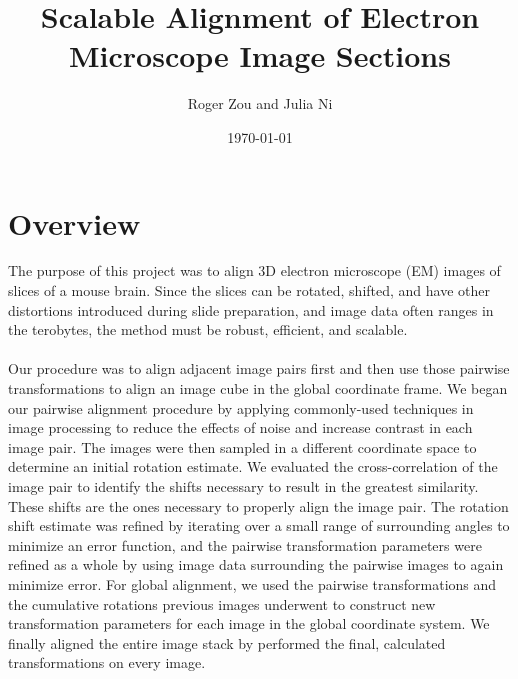 \documentclass{article}
\author{Roger Zou and Julia Ni}
\date{\today}
\title{Scalable Alignment of Electron Microscope Image Sections}
\begin{document}
  
\maketitle
 
\section{Overview}
The purpose of this project was to align 3D electron microscope (EM) images of slices of a mouse brain. Since the slices can be rotated, shifted, and have other distortions introduced during slide preparation, and image data often ranges in the terobytes, the method must be robust, efficient, and scalable.\\
\\
Our procedure was to align adjacent image pairs first and then use those pairwise transformations to align an image cube in the global coordinate frame. We began our pairwise alignment procedure by applying commonly-used techniques in image processing to reduce the effects of noise and increase contrast in each image pair. The images were then sampled in a different coordinate space to determine an initial rotation estimate. We evaluated the cross-correlation of the image pair to identify the shifts necessary to result in the greatest similarity. These shifts are the ones necessary to properly align the image pair. The rotation shift estimate was refined by iterating over a small range of surrounding angles to minimize an error function, and the pairwise transformation parameters were refined as a whole by using image data surrounding the pairwise images to again minimize error. For global alignment, we used the pairwise transformations and the cumulative rotations previous images underwent to construct new transformation parameters for each image in the global coordinate system. We finally aligned the entire image stack by performed the final, calculated transformations on every image.
\end{document}
